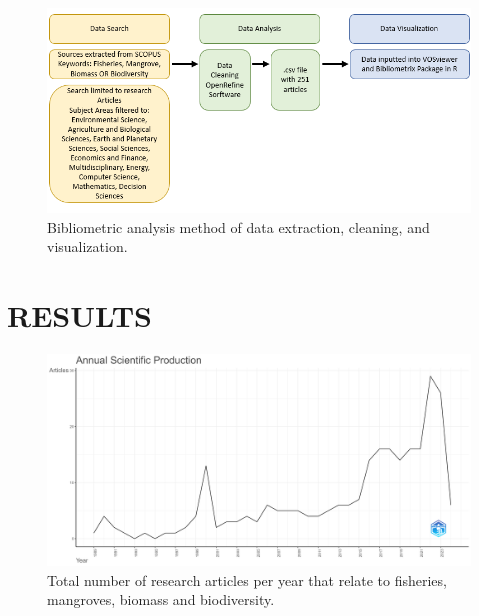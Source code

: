 \documentclass[
  12pt,
]{article}
\begin{document}
\begin{figure}
\includegraphics[width=10.5in]{MethodsFig} \caption{Bibliometric analysis method of data extraction, cleaning, and visualization. \label{MethodsFig}}\label{fig:MethodsFig}
\end{figure}

\hypertarget{results}{%
\section{RESULTS}\label{results}}

\begin{figure}
\includegraphics[width=1\linewidth]{AnnualScientificProduction} \caption{Total number of research articles per year that relate to fisheries, mangroves, biomass and biodiversity. \label{AnnualScientificProduction}}\label{fig:AnnualScientificProduction}
\end{figure}
\end{document}
